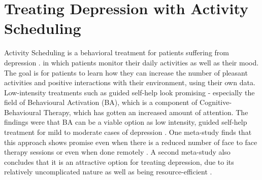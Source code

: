\section{Treating Depression with Activity Scheduling}
Activity Scheduling is a behavioral treatment for patients suffering from depression \cite{comparative_effectiveness_psycho_treatments}. in which patients monitor their daily activities as well as their mood. The goal is for patients to learn how they can increase the number of pleasant activities and positive interactions with their environment, using their own data. Low-intensity treatments such as guided self-help look promising - especially the field of  Behavioural Activation (BA), which is a component of Cognitive-Behavioural Therapy, which has gotten an increased amount of attention. The findings were that BA can be a viable option as low intensity, guided self-help treatment for mild to moderate cases of depression \cite{behavioural_activation_for_depression}. One meta-study finds that this approach shows promise even when there is a reduced number of face to face therapy sessions or even when done remotely \cite{comparative_effectiveness_psycho_treatments}. A second meta-study also concludes that it is an attractive option for treating depression, due to its relatively uncomplicated nature as well as being resource-efficient \cite{behavioural_activation_meta_analysis}. 



